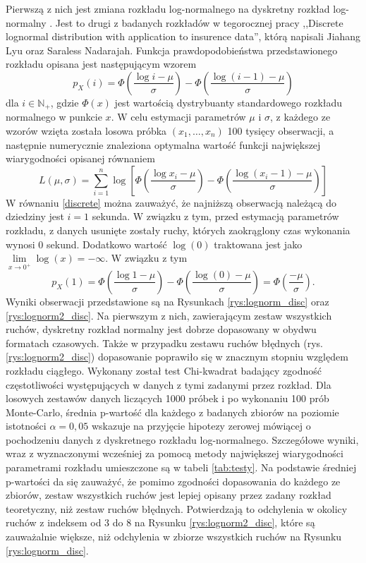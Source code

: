 \documentclass[inzynierska]{pwr_wmat_praca_dyplomowa}
\theoremstyle{plain}
\numberwithin{theorem}{chapter}
\theoremstyle{definition}
\numberwithin{theorem}{chapter}
\begin{document}
Pierwszą z nich jest zmiana rozkładu log-normalnego na dyskretny rozkład log-normalny \cite{lognorm_disc}. Jest to drugi z badanych rozkładów w tegorocznej pracy ,,Discrete lognormal distribution with application to insurence data'', którą napisali Jiahang Lyu oraz Saraless Nadarajah. Funkcja prawdopodobieństwa przedstawionego rozkładu opisana jest następującym wzorem
\begin{equation}\label{discrete}
	p_{X}(i)= \Phi\left(\frac{\log i - \mu}{\sigma} \right) - \Phi\left(\frac{\log \left(i - 1\right) - \mu}{\sigma} \right)
\end{equation}
dla $i \in \mathbb{N}_+$,
gdzie $\Phi(x)$ jest wartością dystrybuanty standardowego rozkładu normalnego w punkcie $x$.
W celu estymacji parametrów $\mu$ i $\sigma$, z każdego ze wzorów wzięta została losowa próbka $(x_1, \dots, x_n)$ 100 tysięcy obserwacji, a następnie numerycznie znaleziona optymalna wartość funkcji największej wiarygodności opisanej równaniem
\begin{equation}
	L(\mu,\sigma) = \sum_{i=1}^{n} \log\left[ \Phi\left(\frac{\log x_i - \mu}{\sigma} \right) - \Phi\left(\frac{\log \left(x_i - 1\right) - \mu}{\sigma} \right)\right]
\end{equation}
W równaniu \ref{discrete} można zauważyć, że najniższą obserwacją należącą do dziedziny jest $i = 1$ sekunda. W związku z tym, przed estymacją parametrów rozkładu, z danych usunięte zostały ruchy, których zaokrąglony czas wykonania wynosi 0 sekund. Dodatkowo wartość $\log(0)$ traktowana jest jako $\lim\limits_{x \rightarrow 0^{+}}\log(x) = -\infty$. W związku z tym
\begin{equation*}
	p_{X}(1) = \Phi\left(\frac{\log 1 - \mu}{\sigma} \right) - \Phi\left(\frac{\log \left(0\right) - \mu}{\sigma} \right) = \Phi\left(\frac{- \mu}{\sigma} \right).
\end{equation*}
 Wyniki obserwacji przedstawione są na Rysunkach \ref{rys:lognorm_disc} oraz \ref{rys:lognorm2_disc}. Na pierwszym z nich, zawierającym zestaw wszystkich ruchów, dyskretny rozkład normalny jest dobrze dopasowany w obydwu formatach czasowych. Także w przypadku zestawu ruchów błędnych (rys. \ref{rys:lognorm2_disc}) dopasowanie poprawiło się w znacznym stopniu względem rozkładu ciągłego. Wykonany został test Chi-kwadrat badający zgodność częstotliwości występujących w danych z tymi zadanymi przez rozkład. Dla losowych zestawów danych liczących 1000 próbek i po wykonaniu 100 prób Monte-Carlo, średnia p-wartość dla każdego z badanych zbiorów na poziomie istotności $\alpha = 0,05$ wskazuje na przyjęcie hipotezy zerowej mówiącej o pochodzeniu danych z dyskretnego rozkładu log-normalnego. Szczegółowe wyniki, wraz z wyznaczonymi wcześniej za pomocą metody największej wiarygodności parametrami rozkładu umieszczone są w tabeli \ref{tab:testy}. Na podstawie średniej p-wartości da się zauważyć, że pomimo zgodności dopasowania do każdego ze zbiorów, zestaw wszystkich ruchów jest lepiej opisany przez zadany rozkład teoretyczny, niż zestaw ruchów błędnych. Potwierdzają to odchylenia w okolicy ruchów z indeksem od 3 do 8 na Rysunku \ref{rys:lognorm2_disc}, które są zauważalnie większe, niż odchylenia w zbiorze wszystkich ruchów na Rysunku \ref{rys:lognorm_disc}.
\end{document}
